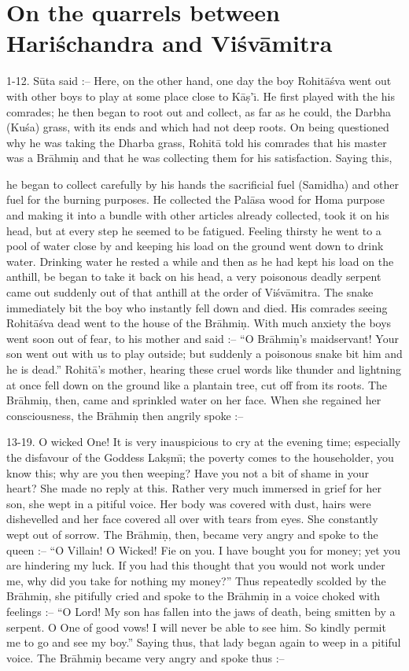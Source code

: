 \chapter{On the quarrels between Hari\'schandra and Vi\'sv\=amitra}

1-12. S\=uta said :-- Here, on the other hand, one day the boy Rohit\=a\'sva went out with other boys to play at some place close to K\=a\d{s}'\={\i}. He first played with the his comrades; he then began to root out and collect, as far as he could, the Darbha (Ku\'sa) grass, with its ends and which had not deep roots. On being questioned why he was taking the Dharba grass, Rohit\=a told his comrades that his master was a Br\=ahmi\d{n} and that he was collecting them for his satisfaction. Saying this,

he began to collect carefully by his hands the sacrificial fuel (Samidha) and other fuel for the burning purposes. He collected the Pal\=asa wood for Homa purpose and making it into a bundle with other articles already collected, took it on his head, but at every step he seemed to be fatigued. Feeling thirsty he went to a pool of water close by and keeping his load on the ground went down to drink water. Drinking water he rested a while and then as he had kept his load on the anthill, be began to take it back on his head, a very poisonous deadly serpent came out suddenly out of that anthill at the order of Vi\'sv\=amitra. The snake immediately bit the boy who instantly fell down and died. His comrades seeing Rohit\=a\'sva dead went to the house of the Br\=ahmi\d{n}. With much anxiety the boys went soon out of fear, to his mother and said :-- ``O Br\=ahmi\d{n}'s maidservant! Your son went out with us to play outside; but suddenly a poisonous snake bit him and he is dead.'' Rohit\=a's mother, hearing these cruel words like thunder and lightning at once fell down on the ground like a plantain tree, cut off from its roots. The Br\=ahmi\d{n}, then, came and sprinkled water on her face. When she regained her consciousness, the Br\=ahmi\d{n} then angrily spoke :--

13-19. O wicked One! It is very inauspicious to cry at the evening time; especially the disfavour of the Goddess Lak\d{s}m\={\i}; the poverty comes to the householder, you know this; why are you then weeping? Have you not a bit of shame in your heart? She made no reply at this. Rather very much immersed in grief for her son, she wept in a pitiful voice. Her body was covered with dust, hairs were dishevelled and her face covered all over with tears from eyes. She constantly wept out of sorrow. The Br\=ahmi\d{n}, then, became very angry and spoke to the queen :-- ``O Villain! O Wicked! Fie on you. I have bought you for money; yet you are hindering my luck. If you had this thought that you would not work under me, why did you take for nothing my money?'' Thus repeatedly scolded by the Br\=ahmi\d{n}, she pitifully cried and spoke to the Br\=ahmi\d{n} in a voice choked with feelings :-- ``O Lord! My son has fallen into the jaws of death, being smitten by a serpent. O One of good vows! I will never be able to see him. So kindly permit me to go and see my boy.'' Saying thus, that lady began again to weep in a pitiful voice. The Br\=ahmi\d{n} became very angry and spoke thus :--

